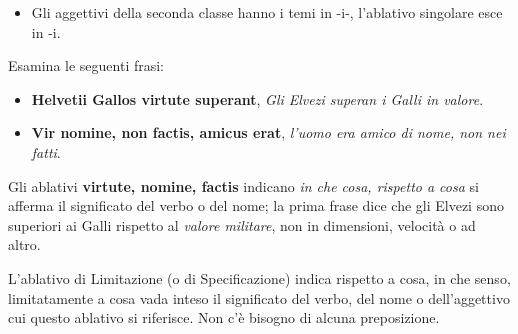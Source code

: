 \documentclass[nols]{tufte-handout}
\newcommand{\textls}[2][5]{%
    \begingroup\addfontfeatures{LetterSpace=#1}#2\endgroup
  }
\renewcommand{\smallcapsspacing}[1]{\textls[10]{#1}}
\renewcommand{\textsc}[1]{\smallcapsspacing{\textsmallcaps{#1}}}
\begin{document}
\begin{itemize}
\item[\textsc{1.}] Gli aggettivi della seconda classe hanno i temi in -i-, l'ablativo singolare esce in -i.  
\end{itemize}

 Esamina le seguenti frasi:
\begin{itemize}
\item[\textsc{1.}] \textbf{Helvetii Gallos virtute superant}, \textit{Gli Elvezi superan i Galli in valore}.  
\item[\textsc{2.}] \textbf{Vir nomine, non factis, amicus erat}, \textit{l'uomo era amico di nome, non nei fatti}.  
\end{itemize}

Gli ablativi \textbf{virtute, nomine, factis} indicano \textit{in che cosa, rispetto a cosa} si afferma il significato del verbo o del nome; la prima frase dice che gli Elvezi sono superiori ai Galli rispetto al \textit{valore militare}, non in dimensioni, velocità o ad altro. 

 L'ablativo di Limitazione (o di Specificazione) indica rispetto a cosa, in che senso, limitatamente a cosa vada inteso il significato del verbo, del nome o dell'aggettivo cui questo ablativo si riferisce. Non c'è bisogno di alcuna preposizione.


\end{document}
